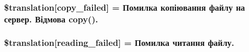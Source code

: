 \subsubsection[{\$translation}]{\setlength{\rightskip}{0pt plus 5cm}\$translation\mbox{[}\textquotesingle{}copy\+\_\+failed\textquotesingle{}\mbox{]} = \textquotesingle{}Помилка копіювання файлу на сервер. Відмова copy().\textquotesingle{}}\label{class_8upload_8uk___u_a_8php_a783c9358bcf54a054545b50098bc679b}
\hypertarget{class_8upload_8uk___u_a_8php_a01bea14c9fd5f353f62db44beabfcd42}{}
\subsubsection[{\$translation}]{\setlength{\rightskip}{0pt plus 5cm}\$translation\mbox{[}\textquotesingle{}reading\+\_\+failed\textquotesingle{}\mbox{]} = \textquotesingle{}Помилка читання файлу.\textquotesingle{}}\label{class_8upload_8uk___u_a_8php_a01bea14c9fd5f353f62db44beabfcd42}
